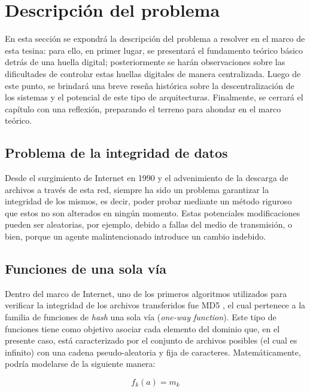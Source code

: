 \section{Descripción del problema}
\label{desc_problem}

En esta sección se expondrá la descripción del problema a resolver en el marco de esta tesina: para ello, en primer lugar, se presentará el fundamento teórico básico detrás de una huella digital; posteriormente se harán observaciones sobre las dificultades de controlar estas huellas digitales de manera centralizada. Luego de este punto, se brindará una breve reseña histórica sobre la descentralización de los sistemas y el potencial de este tipo de arquitecturas. Finalmente, se cerrará el capítulo con una reflexión, preparando el terreno para ahondar en el marco teórico.

\subsection{Problema de la integridad de datos}

Desde el surgimiento de Internet en 1990 y el advenimiento de la descarga de archivos a través de esta red, siempre ha sido un problema garantizar la integridad de los mismos, es decir, poder probar mediante un método riguroso que estos no son alterados en ningún momento. Estas potenciales modificaciones pueden ser aleatorias, por ejemplo, debido a fallas del medio de transmisión, o bien, porque un agente malintencionado introduce un cambio indebido.

\subsection{Funciones de una sola vía}
\label{funcion_una_sola_via}

Dentro del marco de Internet, uno de los primeros algoritmos utilizados para verificar la integridad de los archivos transferidos fue MD5 \cite{Rivest1992}, el cual pertenece a la familia de funciones de \textit{hash} una sola vía (\textit{one-way function}). Este tipo de funciones tiene como objetivo asociar cada elemento del dominio que, en el presente caso, está caracterizado por el conjunto de archivos posibles (el cual es infinito) con una cadena pseudo-aleatoria y fija de caracteres. Matemáticamente, podría modelarse de la siguiente manera:

\begin{equation}
  f_k(a) = m_k
\end{equation}

